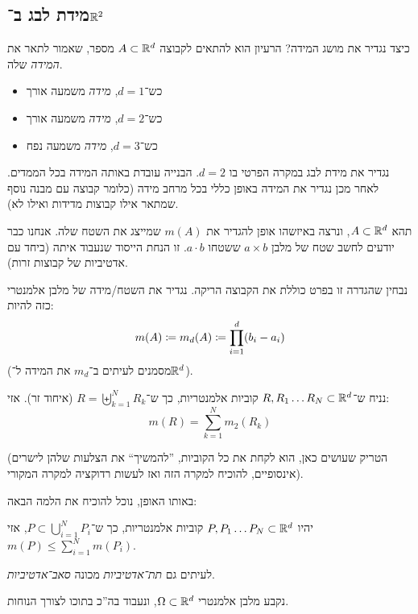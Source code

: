 \documentclass[name=רשימות פונקציות ממשיות – WIP]{../../../tex/classes/noChapterMegasumPreamble}
\newcommand \eqs        {\vspace{-13pt}}
\begin{document}
	\subsection{מידת לבג ב־$\mathbb{R}^2$}
	
	כיצד נגדיר את מושג המידה? הרעיון הוא להתאים לקבוצה $A \subset \mathbb{R}^{d}$ מספר, שאמור לתאר את \textit{המידה} שלה. 
	\begin{itemize}
		\item כש־$d = 1$, \textit{מידה} משמעה אורך
		\item כש־$d = 2$, \textit{מידה} משמעה אורך
		\item כש־$d = 3$, \textit{מידה} משמעה נפח
	\end{itemize}
	
	נגדיר את מידת לבג במקרה הפרטי בו $d = 2$. הבנייה עובדת באותה המידה בכל הממדים. לאחר מכן נגדיר את המידה באופן כללי בכל מרחב מידה (כלומר קבוצה עם מבנה נוסף שמתאר אילו קבוצות מדידות ואילו לא). 
	
	תהא $A \subset \mathbb{R}^{d}$, ונרצה באיזשהו אופן להגדיר את $m(A)$ שמייצג את השטח שלה. אנחנו כבר יודעים לחשב שטח של מלבן $a \times b$ ששטחו $a \cdot b$. זו הנחת הייסוד שנעבוד איתה (ביחד עם אדטיביות של קבוצות זרות). 
	
	\defi{\textit{מלבן אלמנטרי} ב־$\R^{d}$ הוא קבוצה מהצורה $\prod_{i = 1}^{d}[a_i, b_i)$ כאשר $a_i \le b_i\in \R$. }
	
	נבחין שהגדרה זו בפרט כוללת את הקבוצה הריקה. נגדיר את השטח/מידה של מלבן אלמנטרי כזה להיות: 
	\[ m(A) \coloneqq m_d(A) \coloneqq \prod_{i = 1}^{d}(b_i - a_i) \]
	(מסמנים לעיתים ב־$m_d$ את המידה ל־$\R^{d}$). 
	 
	\begin{Lemma}[אדטיביות]
		נניח ש־$R, R_1 \dots R_N \subset \mathbb{R}^{d}$ קוביות אלמנטריות, כך ש־$R = \biguplus_{k = 1}^{N}R_k$ (איחוד זר). אזי: 
		\[ m(R) = \sum_{k = 1}^{N}m_2(R_k) \]\eqs
	\end{Lemma}
	\prooftrivial
	(הטריק שעושים כאן, הוא לקחת את כל הקוביות, ''להמשיך`` את הצלעות שלהן לישרים אינסופיים, להוכיח למקרה הזה ואז לעשות רדוקציה למקרה המקורי). 
	
	באותו האופן, נוכל להוכיח את הלמה הבאה: 
	\begin{Lemma}[תת־אדטיביות]
		יהיו $P, P_1 \dots P_N \subset \mathbb{R}^{d}$ קוביות אלמנטריות, כך ש־$P \subset \bigcup_{i = 1}^{N}P_i$, אזי $m(P) \le \sum_{i = 1}^{N}m(P_i)$. 
	\end{Lemma}
	
	לעיתים גם \textit{תת־אדטיביות} מכונה \textit{סאב־אדטיביות}. 
	
	נקבע מלבן אלמנטרי $\Omega \subset \mathbb{R}^{d}$, ונעבוד בה''כ בתוכו לצורך הנוחות. 
	
\end{document}
